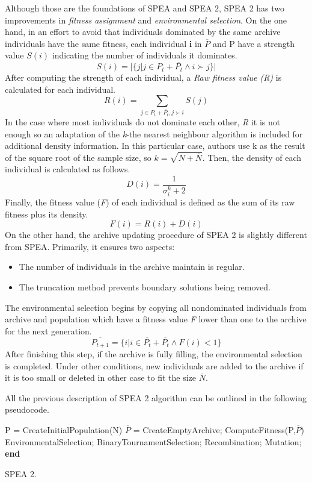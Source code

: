 Although those are the foundations of SPEA and SPEA 2, SPEA 2 has two improvements in \textit{fitness assignment} and \textit{environmental selection}.
On the one hand, in an effort to avoid that individuals dominated by the same archive individuals have the same fitness, each individual \textbf{i} in $\overline{P}$ and P have a strength value $S(i)$ indicating the number of individuals it dominates\cite{SPEA2}.
\[
    S(i) = | \{ j | j \in P_{t} + \overline{P_{t}} \land	 i \succ j \} |
\]
After computing the strength of each individual, a \textit{Raw fitness value (R)} is calculated for each individual.
\[
    R(i) = \sum_{j\in P_{t} + \overline{P_{t}}, j \succ i}{S(j)}
\]
In the case where most individuals do not dominate each other, \textit{R} it is not enough so an adaptation of the \textit{k}-the nearest neighbour algorithm is included for additional density information. In this particular case, authors use k as the result of the square root of the sample size, so $k = \sqrt{N + \overline{N}}$. Then, the density of each individual is calculated as follows.
\[
    D(i) = \frac{1}{\sigma_{i}^{k} + 2}
\]
Finally, the fitness value (\textit{F}) of each individual is defined as the sum of its raw fitness plus its density.
\[
    F(i) = R(i) + D(i)
\]
On the other hand, the archive updating procedure of SPEA 2 is slightly different from SPEA. Primarily, it ensures two aspects\cite{SPEA2}: 
\begin{itemize}
    \item The number of individuals in the archive maintain is regular.
    \item The truncation method prevents boundary solutions being removed.
\end{itemize}
The environmental selection begins by copying all nondominated individuals from archive and population which have a fitness value \textit{F} lower than one to the archive for the next generation.
\[
\overline{P_{t+1}} = \{ i | i \in \overline{P_{t}} + \overline{P_{t}} \land F(i) < 1 \}
\]
After finishing this step, if the archive is fully filling, the environmental selection is completed. Under other conditions, new individuals are added to the archive if it is too small or deleted in other case to fit the size $\overline{N}$.

All the previous description of SPEA 2 algorithm can be outlined in the following pseudocode.
\begin{algorithm}[H]
\begin{algorithmic}[1]
\State P = CreateInitialPopulation(N)\;
\State $\overline{P}$ = CreateEmptyArchive;\;
    \State ComputeFitness(P,$\overline{P}$)
    \State EnvironmentalSelection;
    \State BinaryTournamentSelection;
    \State Recombination;
    \State Mutation;
  \EndWhile
  \State \textbf{end}
\end{algorithmic}
\caption{SPEA 2.}
\end{algorithm}  